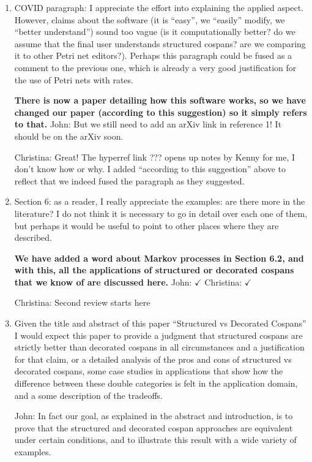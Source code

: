\documentclass[reqno]{amsart}
\def\chris{\color{purple} Christina: }
\def\john{\color{red} John: }
\begin{document}
\begin{enumerate}
{\bf Done.} {\john $\checkmark$} {\chris $\checkmark$}

\item COVID paragraph: I appreciate the effort into explaining the applied aspect. However, claims about the software (it is “easy”, we “easily”  modify, we “better understand”) sound too vague (is it computationally better? do we assume that the final user understands structured cospans? are we comparing  it to other Petri net editors?). Perhaps this paragraph could be fused as a comment to the previous one, which is already a very good justification  for the use of Petri nets with rates.

{\bf There is now a paper detailing how this software works, so we have changed our paper (according to this suggestion)
so it simply refers to that.}   {\john But we still need to add an arXiv link in reference 1!  It should be on the arXiv soon.} 

{\chris Great! The 
hyperref link ??? opens up notes by Kenny for me, I don't know how or why. I added ``according to this suggestion'' above to reflect that we indeed 
fused the paragraph as they suggested.}

\item Section 6: as a reader, I really appreciate the examples: are there more in the literature? I do not think it is necessary to go in detail over each one of them, but perhaps it would be useful to point to other places where they are described.

{\bf We have added a word about Markov processes in Section 6.2, and with this, all the applications of structured or decorated cospans that we know 
of are discussed here.} {\john $\checkmark$} {\chris $\checkmark$}

{\chris Second review starts here}
\item Given the title and abstract of this paper “Structured vs Decorated Cospans” I would expect this paper to provide a judgment that structured  cospans are strictly better than decorated cospans in all circumstances and a justification for that claim, or a detailed analysis of the pros and cons of 
structured vs decorated cospans, some case studies in applications that show how the difference between these double categories is felt in the application domain, and a some description of the tradeoffs. 

{\john In fact our goal, as explained in the abstract and introduction, is to prove that the structured and decorated cospan approaches are equivalent under certain conditions, and to illustrate this result with a wide variety of examples.}


\end{enumerate}
\end{document}
